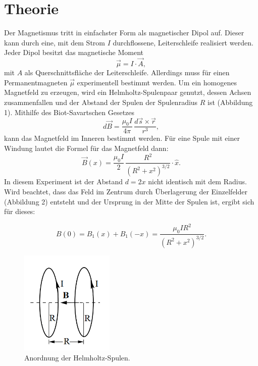 \section{Theorie}
\label{sec:Theorie}

Der Magnetismus tritt in einfachster Form als magnetischer Dipol auf. Dieser kann durch eine, mit dem Strom $I$ durchflossene, Leiterschleife realisiert werden. Jeder Dipol besitzt das magnetische Moment
\begin{equation}
    \vec{\mu} = I \cdot \vec{A} ,
\end{equation}
mit $A$ als Querschnittsfläche der Leiterschleife. Allerdings muss für einen Permanentmagneten $\vec{\mu}$ experimentell bestimmt werden.
Um ein homogenes Magnetfeld zu erzeugen, wird ein Helmholtz-Spulenpaar genutzt, dessen Achsen zusammenfallen und der Abstand der Spulen der Spulenradius $R$ ist (Abbildung 1).
Mithilfe des Biot-Savartschen Gesetzes
\begin{equation}
    d\vec{B} =  \frac{\mu_\text{0}I}{4\pi}\,\frac{d\vec{s}\times\vec{r}}{r^3} ,
\end{equation}
kann das Magnetfeld im Inneren bestimmt werden.
Für eine Spule mit einer Windung lautet die Formel für das Magnetfeld dann:
\begin{equation}
    \vec{B}(x) = \frac{\mu_\text{0}I}{2}\,\frac{R^2}{(R^2+x^2)^{3/2}}\cdot \hat{x}.
\end{equation}
In diesem Experiment ist der Abstand $d = 2x$ nicht identisch mit dem Radius.
Wird beachtet, dass das Feld im Zentrum durch Überlagerung der Einzelfelder (Abbildung 2) entsteht und der Ursprung in der Mitte der Spulen ist,
ergibt sich für dieses:

\begin{equation}
   B(0) = B_\text{1}(x)+B_\text{1}(-x) = \frac{\mu_\text{0}IR^2}{(R^2+x^2)^{3/2}} .
\end{equation}

\begin{figure}[H]
  \centering
  \includegraphics[height=5cm]{Screenshot (2)}
  \caption{Anordnung der Helmholtz-Spulen. \cite[S. 1]{kent}}
  \label{fig:drill}
\end{figure}


